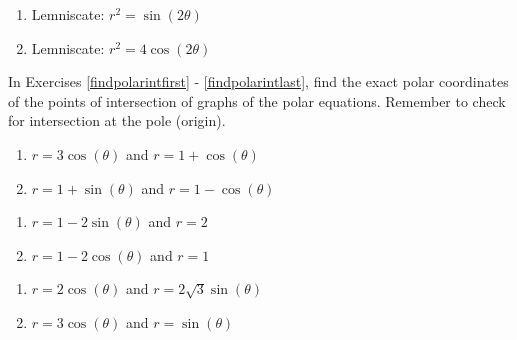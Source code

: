 \begin{multicols}{2} 

\begin{enumerate}

\setcounter{enumi}{\value{HW}}

\item Lemniscate: $r^{2} = \sin(2\theta)$ 
\item Lemniscate: $r^{2} = 4\cos(2\theta)$ \label{polarplotlast}

\setcounter{HW}{\value{enumi}}

\end{enumerate}

\end{multicols}

In Exercises \ref{findpolarintfirst} - \ref{findpolarintlast}, find the exact polar coordinates of the points of intersection of graphs of the polar equations.  Remember to check for intersection at the pole (origin).

\begin{multicols}{2}

\begin{enumerate}

\setcounter{enumi}{\value{HW}}

\item $r = 3\cos(\theta)$ and $r = 1 + \cos(\theta)$ \label{findpolarintfirst}
\item $r = 1 + \sin(\theta)$ and $r = 1 - \cos(\theta)$

\setcounter{HW}{\value{enumi}}

\end{enumerate}

\end{multicols}

\begin{multicols}{2} 

\begin{enumerate}

\setcounter{enumi}{\value{HW}}

\item $r = 1-2\sin(\theta)$ and $r=2$
\item $r = 1 - 2\cos(\theta)$ and $r = 1$

\setcounter{HW}{\value{enumi}}

\end{enumerate}

\end{multicols}

\begin{multicols}{2} 

\begin{enumerate}

\setcounter{enumi}{\value{HW}}

\item $r = 2\cos(\theta)$ and $r = 2\sqrt{3} \sin(\theta)$
\item $r = 3\cos(\theta)$ and $r = \sin(\theta)$

\setcounter{HW}{\value{enumi}}

\end{enumerate}

\end{multicols}

